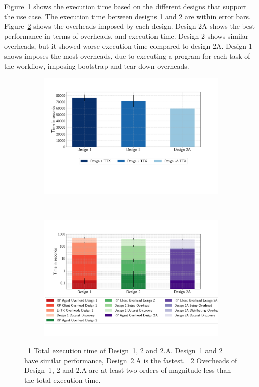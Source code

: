 Figure~\ref{fig:ttx} shows the execution time based on the different designs that support the use case. 
The execution time between designs 1 and 2 are within error bars.
Figure~\ref{fig:overheads} shows the overheads imposed by each design.
Design 2A shows the best performance in terms of overheads, and execution time.
Design 2 shows similar overheads, but it showed worse execution time compared to design 2A.
Design 1 shows imposes the most overheads, due to executing a program for each task of the workflow, imposing bootstrap and tear down overheads.

\begin{figure}[ht!]
    \centering
    \begin{subfigure}[b]{0.45\textwidth}
        \includegraphics[width=\linewidth]{figures/ttx.pdf}
        \caption{}
        \label{fig:ttx}
    \end{subfigure}%
    ~ 
    \begin{subfigure}[b]{0.45\textwidth}
        \includegraphics[width=\linewidth]{figures/overheads.pdf}
        \caption{}
        \label{fig:overheads}
    \end{subfigure}
    \caption{~\ref{fig:ttx} Total execution time of Design~1, 2 and 2.A. Design~1 and 2 have similar performance, Design~2.A is the fastest. ~\ref{fig:overheads} Overheads of Design~1, 2 and 2.A are at least two orders of magnitude less than the total execution time.}\label{fig:overall_performance}
\end{figure}


